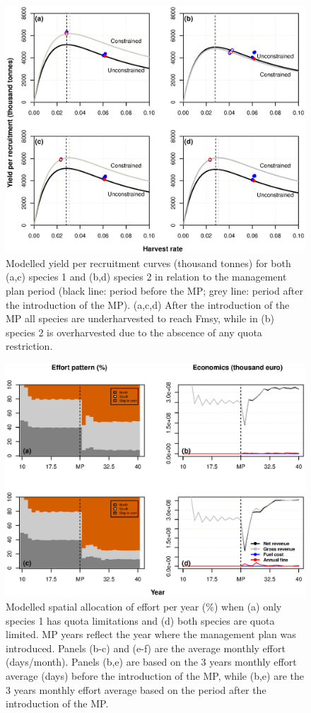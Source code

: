 \documentclass[12pt,oneline,a4paper,numbib]{ouparticle}
\numberwithin{equation}{subsection} %
\begin{document}
\begin{figure}[!ht]
\centering
\includegraphics[width=\textwidth]{Figures/Yields.eps} 
\caption{Modelled yield per recruitment curves (thousand tonnes) for both (a,c) species 1 and (b,d) species 2 in relation to the management plan period (black line: period before the MP; grey line: period after the introduction of the MP). (a,c,d) After the introduction of the MP all species are underharvested to reach Fmsy, while in (b) species 2 is overharvested due to the abscence of any quota restriction.}
\label{f:yields}
\end{figure}

\begin{figure}[!ht]
\centering
\includegraphics[width=\textwidth]{Figures/Efforteconomics.eps} 
\caption{Modelled spatial allocation of effort per year (\%) when (a) only species 1 has quota limitations and (d) both species are quota limited.  MP years reflect the year where the management plan was introduced. Panels (b-c) and (e-f) are the average monthly effort (days/month). Panels (b,e) are based on the 3 years monthly effort average (days) before the introduction of the MP, while (b,e) are the 3 years monthly effort average based on the period after the introduction of the MP.}
\end{figure}
\end{document}

